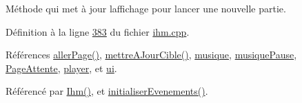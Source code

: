 Méthode qui met à jour l\textquotesingle{}affichage pour lancer une nouvelle partie. 



Définition à la ligne \hyperlink{ihm_8cpp_source_l00383}{383} du fichier \hyperlink{ihm_8cpp_source}{ihm.\+cpp}.



Références \hyperlink{ihm_8cpp_source_l00429}{aller\+Page()}, \hyperlink{ihm_8cpp_source_l00565}{mettre\+A\+Jour\+Cible()}, \hyperlink{ihm_8h_source_l00056}{musique}, \hyperlink{ihm_8h_source_l00057}{musique\+Pause}, \hyperlink{ihm_8h_source_l00074}{Page\+Attente}, \hyperlink{ihm_8h_source_l00064}{player}, et \hyperlink{ihm_8h_source_l00052}{ui}.



Référencé par \hyperlink{ihm_8cpp_source_l00026}{Ihm()}, et \hyperlink{ihm_8cpp_source_l00075}{initialiser\+Evenements()}.


